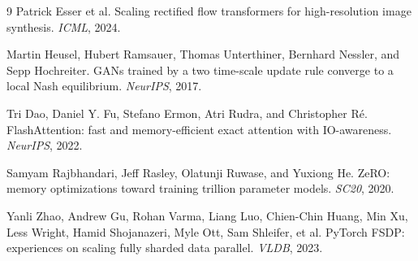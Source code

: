 \documentclass{article}
\begin{document}
\begin{thebibliography}{9}
Patrick Esser et al.
\newblock Scaling rectified flow transformers for high-resolution image synthesis.
\newblock \emph{ICML}, 2024.

Martin Heusel, Hubert Ramsauer, Thomas Unterthiner, Bernhard Nessler, and Sepp Hochreiter.
\newblock GANs trained by a two time-scale update rule converge to a local Nash equilibrium.
\newblock \emph{NeurIPS}, 2017.

Tri Dao, Daniel Y. Fu, Stefano Ermon, Atri Rudra, and Christopher R\'e.
\newblock FlashAttention: fast and memory-efficient exact attention with IO-awareness.
\newblock \emph{NeurIPS}, 2022.

Samyam Rajbhandari, Jeff Rasley, Olatunji Ruwase, and Yuxiong He.
\newblock ZeRO: memory optimizations toward training trillion parameter models.
\newblock \emph{SC20}, 2020.

Yanli Zhao, Andrew Gu, Rohan Varma, Liang Luo, Chien-Chin Huang, Min Xu, Less Wright,
Hamid Shojanazeri, Myle Ott, Sam Shleifer, et al.
\newblock PyTorch FSDP: experiences on scaling fully sharded data parallel.
\newblock \emph{VLDB}, 2023.

\end{thebibliography}
\end{document}
